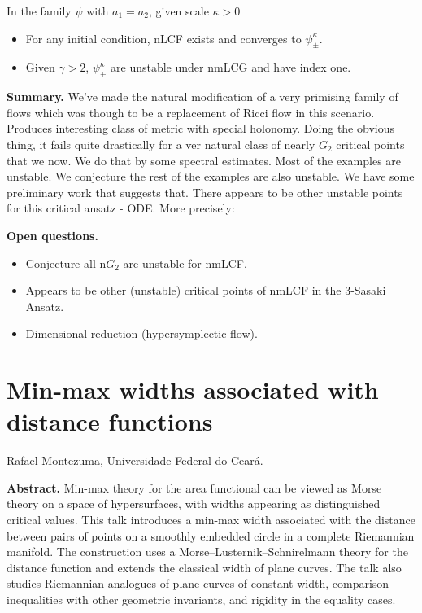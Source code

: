 \begin{theorem}[Lotay-S]
\label{theorem-lotays3}
In the family $\psi$ with $a_1=a_2$,
given scale $\kappa >0$
\begin{itemize}
\item For any initial condition, nLCF
exists and converges to $\psi_{\pm
}^{\kappa}$.
\item Given $\gamma> 2$, $\psi_{\pm }^\kappa$
are unstable under nmLCG and have index one.
\end{itemize}
\end{theorem}

\medskip\noindent
{\bf Summary.}
We've made the natural modification of a
very primising family of flows which was
though to be a replacement of Ricci flow in
this scenario. Produces interesting class of
metric with special holonomy. Doing the
obvious thing, it fails quite drastically
for a ver natural class of nearly $G_2$
critical points that we now. We do that by
some spectral estimates. Most of the
examples are unstable. We conjecture the
rest of the examples are also unstable. We
have some preliminary work that suggests
that. There appears to be other unstable
points for this critical ansatz - ODE.
More precisely:

\medskip\noindent
{\bf Open questions.}
\begin{itemize}
\item Conjecture all n$G_2$ are unstable for
nmLCF.
\item Appears to be other (unstable)
critical points of nmLCF in the 3-Sasaki
Ansatz.
\item Dimensional reduction (hypersymplectic
flow).
\end{itemize}

\section{Min-max widths associated with
distance functions}
\label{section-min-max-distance-widths}

\medskip\noindent
Rafael Montezuma,
Universidade Federal do Cear\'a.

\medskip\noindent
{\bf Abstract.}
Min-max theory for the area functional can
be viewed as Morse theory on a space of
hypersurfaces, with widths appearing as
distinguished critical values. This talk
introduces a min-max width associated with
the distance between pairs of points on a
smoothly embedded circle in a complete
Riemannian manifold. The construction uses
a Morse--Lusternik--Schnirelmann theory for
the distance function and extends the
classical width of plane curves. The talk
also studies Riemannian analogues of plane
curves of constant width, comparison
inequalities with other geometric
invariants, and rigidity in the equality
cases.

